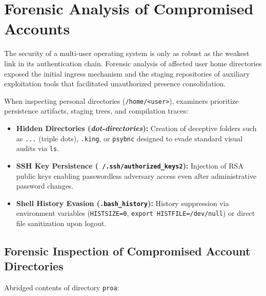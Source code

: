 \chapter{Forensic Analysis of Compromised Accounts}
\label{cap:cuentas_comprometidas}

The security of a multi-user operating system is only as robust as the weakest link in its authentication chain. Forensic analysis of affected user home directories exposed the initial ingress mechanism and the staging repositories of auxiliary exploitation tools that facilitated unauthorized presence consolidation.

\begin{notaforense}
When inspecting personal directories (\texttt{/home/<user>}), examiners prioritize persistence artifacts, staging trees, and compilation traces:
\begin{itemize}
    \item \textbf{Hidden Directories (\textit{dot-directories}):} Creation of deceptive folders such as \texttt{...} (triple dots), \texttt{.king}, or \texttt{psybnc} designed to evade standard visual audits via \texttt{ls}.
    \item \textbf{SSH Key Persistence (\texttt{~/.ssh/authorized\_keys2}):} Injection of RSA public keys enabling passwordless adversary access even after administrative password changes.
    \item \textbf{Shell History Evasion (\texttt{.bash\_history}):} History suppression via environment variables (\texttt{HISTSIZE=0}, \texttt{export HISTFILE=/dev/null}) or direct file sanitization upon logout.
\end{itemize}
\end{notaforense}

\section{Forensic Inspection of Compromised Account Directories}

Abridged contents of directory \texttt{proa}:

\vspace{1em}

